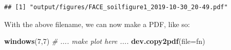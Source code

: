 \documentclass[]{book}
\newenvironment{Shaded}{\begin{snugshade}}{\end{snugshade}}
\newcommand{\CommentTok}[1]{\textcolor[rgb]{0.56,0.35,0.01}{\textit{#1}}}
\newcommand{\DataTypeTok}[1]{\textcolor[rgb]{0.13,0.29,0.53}{#1}}
\newcommand{\DecValTok}[1]{\textcolor[rgb]{0.00,0.00,0.81}{#1}}
\newcommand{\KeywordTok}[1]{\textcolor[rgb]{0.13,0.29,0.53}{\textbf{#1}}}
\newcommand{\NormalTok}[1]{#1}
\begin{document}
\begin{verbatim}
## [1] "output/figures/FACE_soilfigure1_2019-10-30_20-49.pdf"
\end{verbatim}

With the above filename, we can now make a PDF, like so:

\begin{Shaded}
\begin{Highlighting}[]
\KeywordTok{windows}\NormalTok{(}\DecValTok{7}\NormalTok{,}\DecValTok{7}\NormalTok{)}
\CommentTok{# .... make plot here ....}
\KeywordTok{dev.copy2pdf}\NormalTok{(}\DataTypeTok{file=}\NormalTok{fn)}
\end{Highlighting}
\end{Shaded}


\end{document}
